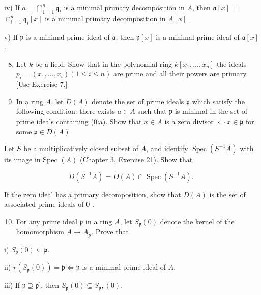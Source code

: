 \documentclass{standalone}
\theoremstyle{definition}
\theoremstyle{remark}
\begin{document}
iv) If $a=\bigcap_{1=1}^{n} \mathfrak{q}_{t}$ is a minimal primary decomposition
in $A$, then $\mathfrak{a}[x]=$ $\cap_{i=1}^{n} \mathfrak{q}_{i}[x]$ is a
minimal primary decomposition in $A[x]$.

v) If $\mathfrak{p}$ is a minimal prime ideal of $\mathfrak{a}$, then
$\mathfrak{p}[x]$ is a minimal prime ideal of $\mathfrak{a}[x]$.

\begin{enumerate}
  \setcounter{enumi}{7}
  \item Let $k$ be a field. Show that in the polynomial ring $k\left[x_{1},
  \ldots, x_{n}\right]$ the ideals $p_{i}=\left(x_{1}, \ldots, x_{i}\right)(1
  \leqslant i \leqslant n)$ are prime and all their powers are primary. [Use
  Exercise 7.]

  \item In a ring $A$, let $D(A)$ denote the set of prime ideals $\mathfrak{p}$
  which satisfy the following condition: there exists $a \in A$ such that
  $\mathfrak{p}$ is minimal in the set of prime ideals containing (0:a). Show
  that $x \in A$ is a zero divisor $\Leftrightarrow x \in \mathfrak{p}$ for some
  $\mathfrak{p} \in D(A)$.

\end{enumerate}

Let $S$ be a multiplicatively closed subset of $A$, and identify
$\operatorname{Spec}\left(S^{-1} A\right)$ with its image in Spec $(A)$ (Chapter
3, Exercise 21). Show that

\[
D\left(S^{-1} A\right)=D(A) \cap \operatorname{Spec}\left(S^{-1} A\right) \text {. }
\]

If the zero ideal has a primary decomposition, show that $D(A)$ is the set of
associated prime ideals of 0 .

\begin{enumerate}
  \setcounter{enumi}{9}
  \item For any prime ideal $\mathfrak{p}$ in a ring $A$, let
  $S_{\mathfrak{p}}(0)$ denote the kernel of the homomorphism $A \rightarrow
  A_{p}$. Prove that
\end{enumerate}

i) $S_{\mathfrak{p}}(0) \subseteq \mathfrak{p}$.

ii) $r\left(S_{\mathfrak{p}}(0)\right)=\mathfrak{p} \Leftrightarrow
\mathfrak{p}$ is a minimal prime ideal of $A$.

iii) If $\mathfrak{p} \supseteq \mathfrak{p}^{\prime}$, then
$S_{\mathfrak{p}}(0) \subseteq S_{\mathfrak{p}},(0)$.
\end{document}
